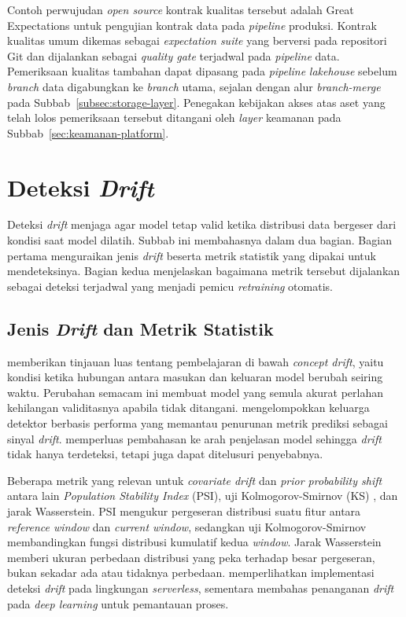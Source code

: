 Contoh perwujudan \textit{open source} kontrak kualitas tersebut adalah Great Expectations \autocite{greatexpectations2024} untuk pengujian kontrak data pada \textit{pipeline} produksi. Kontrak kualitas umum dikemas sebagai \textit{expectation suite} yang berversi pada repositori Git dan dijalankan sebagai \textit{quality gate} terjadwal pada \textit{pipeline} data. Pemeriksaan kualitas tambahan dapat dipasang pada \textit{pipeline} \textit{lakehouse} sebelum \textit{branch} data digabungkan ke \textit{branch} utama, sejalan dengan alur \textit{branch-merge} pada Subbab~\ref{subsec:storage-layer}. Penegakan kebijakan akses atas aset yang telah lolos pemeriksaan tersebut ditangani oleh \textit{layer} keamanan pada Subbab~\ref{sec:keamanan-platform}.


\section{Deteksi \textit{Drift}}
\label{sec:drift}

Deteksi \textit{drift} menjaga agar model tetap valid ketika distribusi data bergeser dari kondisi saat model dilatih. Subbab ini membahasnya dalam dua bagian. Bagian pertama menguraikan jenis \textit{drift} beserta metrik statistik yang dipakai untuk mendeteksinya. Bagian kedua menjelaskan bagaimana metrik tersebut dijalankan sebagai deteksi terjadwal yang menjadi pemicu \textit{retraining} otomatis.

\subsection{Jenis \textit{Drift} dan Metrik Statistik}
\label{subsec:drift-metrik}

\textcite{lu2019learning} memberikan tinjauan luas tentang pembelajaran di bawah \textit{concept drift}, yaitu kondisi ketika hubungan antara masukan dan keluaran model berubah seiring waktu. Perubahan semacam ini membuat model yang semula akurat perlahan kehilangan validitasnya apabila tidak ditangani. \textcite{bayram2022concept} mengelompokkan keluarga detektor berbasis performa yang memantau penurunan metrik prediksi sebagai sinyal \textit{drift}. \textcite{hinder2023model} memperluas pembahasan ke arah penjelasan model sehingga \textit{drift} tidak hanya terdeteksi, tetapi juga dapat ditelusuri penyebabnya.

Beberapa metrik yang relevan untuk \textit{covariate drift} dan \textit{prior probability shift} antara lain \textit{Population Stability Index} (PSI), uji Kolmogorov-Smirnov (KS) \autocite{reis2016kdd}, dan jarak Wasserstein. PSI mengukur pergeseran distribusi suatu fitur antara \textit{reference window} dan \textit{current window}, sedangkan uji Kolmogorov-Smirnov membandingkan fungsi distribusi kumulatif kedua \textit{window}. Jarak Wasserstein memberi ukuran perbedaan distribusi yang peka terhadap besar pergeseran, bukan sekadar ada atau tidaknya perbedaan. \textcite{cespedes2024efficient} memperlihatkan implementasi deteksi \textit{drift} pada lingkungan \textit{serverless}, sementara \textcite{jourdan2023handling} membahas penanganan \textit{drift} pada \textit{deep learning} untuk pemantauan proses.

